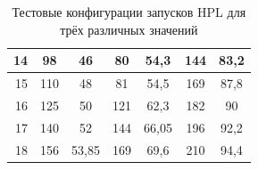 \begin{table}
\begin{tabular}{|r||c|c||c|c||c|c|}
				14          &  98 &                     46 &  80 &                   54,3 & 144 & 83,2                   \\ \hline
				15          & 110 &                     48 &  81 &                   54,5 & 169 & 87,8                   \\ \hline
				16          & 125 &                     50 & 121 &                   62,3 & 182 & 90                     \\ \hline
				17          & 140 &                     52 & 144 &                  66,05 & 196 & 92,2                   \\ \hline
				18          & 156 &                  53,85 & 169 &                   69,6 & 210 & 94,4                   \\ \hline
			\end{tabular}
			\caption{Тестовые конфигурации запусков HPL для трёх различных значений}
			\label{test_HPL}
		\end{table}

